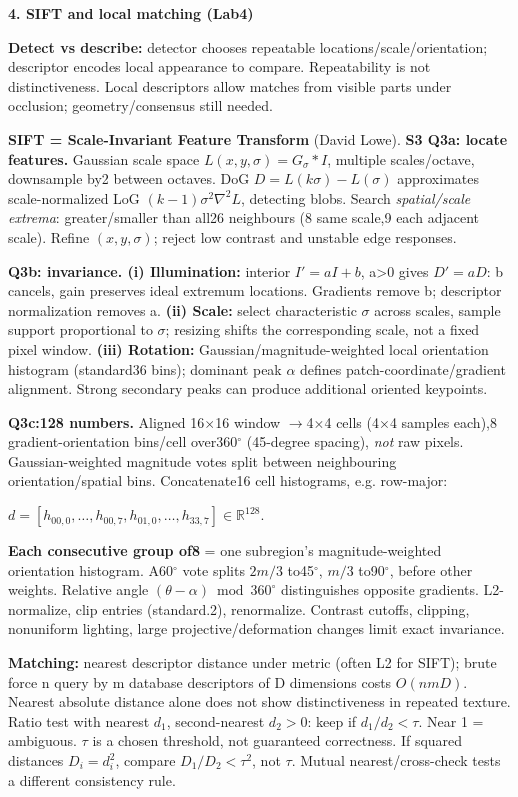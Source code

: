 \documentclass[a4paper]{article}
\newcommand{\key}[1]{\textbf{#1}}
\newcommand{\Topic}[1]{\par\vspace{1.7pt}\noindent
  {\fontsize{7.7}{8.0}\selectfont\bfseries #1}\par\vspace{0.3pt}}
\newcommand{\eq}[1]{\par\noindent\mbox{\(\displaystyle #1\)}\par}
\newcommand{\R}{\mathbb R}
\newcounter{sheet}
\newcounter{sheetcolumn}
\newlength{\colwidth}
\newenvironment{sheetcol}[1][7.0]{\stepcounter{sheetcolumn}
  \begin{lrbox}{\columnbox}\begin{minipage}[t]{\colwidth}\vspace{0pt}
  \fontsize{#1}{\dimexpr#1pt+0.6pt\relax}\selectfont}
  {\end{minipage}\end{lrbox}
  \typeout{CV1COL|\thesheet|\thesheetcolumn|\the\dimexpr\ht\columnbox+\dp\columnbox\relax}
  \usebox{\columnbox}\ignorespacesafterend}
\begin{document}
\begin{sheetcol}[6.5]
\Topic{4. SIFT and local matching (Lab4)}
\key{Detect vs describe:} detector chooses repeatable locations/scale/orientation; descriptor encodes local appearance to compare. Repeatability is not distinctiveness. Local descriptors allow matches from visible parts under occlusion; geometry/consensus still needed.

\key{SIFT = Scale-Invariant Feature Transform} (David Lowe).
\key{S3 Q3a: locate features.} Gaussian scale space \(L(x,y,\sigma)=G_\sigma*I\), multiple scales/octave, downsample by2 between octaves. DoG \(D=L(k\sigma)-L(\sigma)\) approximates scale-normalized LoG \((k-1)\sigma^2\nabla^2L\), detecting blobs. Search \emph{spatial/scale extrema}: greater/smaller than all26 neighbours (8 same scale,9 each adjacent scale). Refine \((x,y,\sigma)\); reject low contrast and unstable edge responses.

\key{Q3b: invariance. (i) Illumination:} interior \(I'=aI+b\), a>0 gives \(D'=aD\): b cancels, gain preserves ideal extremum locations. Gradients remove b; descriptor normalization removes a. \key{(ii) Scale:} select characteristic \(\sigma\) across scales, sample support proportional to \(\sigma\); resizing shifts the corresponding scale, not a fixed pixel window. \key{(iii) Rotation:} Gaussian/magnitude-weighted local orientation histogram (standard36 bins); dominant peak \(\alpha\) defines patch-coordinate/gradient alignment. Strong secondary peaks can produce additional oriented keypoints.

\key{Q3c:128 numbers.} Aligned 16\(\times\)16 window \(\to\)4\(\times\)4 cells (4\(\times\)4 samples each),8 gradient-orientation bins/cell over360\(^{\circ}\) (45-degree spacing), \emph{not} raw pixels. Gaussian-weighted magnitude votes split between neighbouring orientation/spatial bins. Concatenate16 cell histograms, e.g. row-major:
\eq{d=[h_{00,0},\ldots,h_{00,7},h_{01,0},\ldots,h_{33,7}]\in\R^{128}.}
\key{Each consecutive group of8} = one subregion's magnitude-weighted orientation histogram. A60\(^{\circ}\) vote splits \(2m/3\) to45\(^{\circ}\), \(m/3\) to90\(^{\circ}\), before other weights. Relative angle \((\theta-\alpha)\bmod360^\circ\) distinguishes opposite gradients. L2-normalize, clip entries (standard.2), renormalize. Contrast cutoffs, clipping, nonuniform lighting, large projective/deformation changes limit exact invariance.

\key{Matching:} nearest descriptor distance under metric (often L2 for SIFT); brute force n query by m database descriptors of D dimensions costs \(O(nmD)\). Nearest absolute distance alone does not show distinctiveness in repeated texture. Ratio test with nearest \(d_1\), second-nearest \(d_2>0\): keep if \(d_1/d_2<\tau\). Near 1 = ambiguous. \(\tau\) is a chosen threshold, not guaranteed correctness. If squared distances \(D_i=d_i^2\), compare \(D_1/D_2<\tau^2\), not \(\tau\). Mutual nearest/cross-check tests a different consistency rule.


\end{sheetcol}
\end{document}
